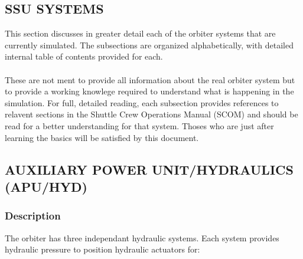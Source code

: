 \documentclass[Space_Shuttle_Ultra_Manual.tex]{subfiles}
\begin{document}
\begin{multicols}{2}

\section{\large SSU SYSTEMS}
\localtableofcontents
\noindent
This section discusses in greater detail each of the orbiter systems that are currently simulated. The subsections are organized alphabetically, with detailed internal table of contents provided for each.\\
\\
These are not ment to provide all information about the real orbiter system but to provide a working knowlege required to understand what is happening in the simulation. For full, detailed reading, each subsection provides references to relavent sections in the Shuttle Crew Operations Manual (SCOM) and should be read for a better understanding for that system.  Thoses who are just after learning the basics will be satisfied by this document.

\newpage
\subsection{\large AUXILIARY POWER UNIT/HYDRAULICS (APU/HYD)}
\localtableofcontents
\subsubsection{\large Description}
The orbiter has three independant hydraulic systems. Each system provides hydraulic pressure to position hydraulic actuators for:
	

\end{multicols}
\end{document}
